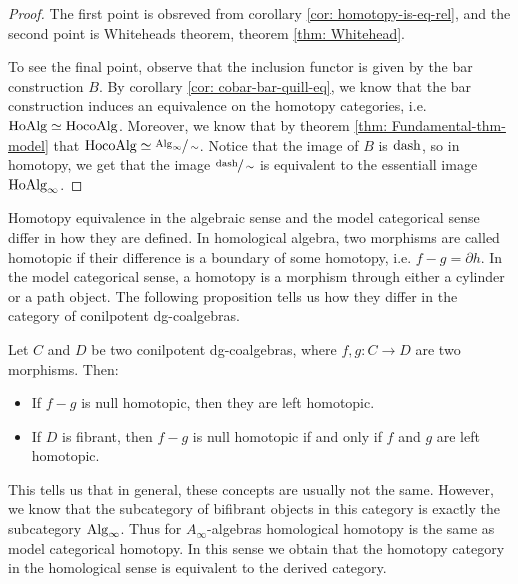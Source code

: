 \documentclass[../thesis.tex]{subfiles}
\begin{document}
    \begin{proof}
        The first point is obsreved from corollary \ref{cor: homotopy-is-eq-rel}, and the second point is Whiteheads theorem, theorem \ref{thm: Whitehead}.

        To see the final point, observe that the inclusion functor is given by the bar construction $B$. By corollary \ref{cor: cobar-bar-quill-eq}, we know that the bar construction induces an equivalence on the homotopy categories, i.e. $\tt{Ho}\tt{Alg} \simeq \tt{Ho}\tt{coAlg}$. Moreover, we know that by theorem \ref{thm: Fundamental-thm-model} that $\tt{Ho}\tt{coAlg} \simeq \sfrac{\tt{Alg}_\infty}{\sim}$. Notice that the image of $B$ is $\tt{dash}$, so in homotopy, we get that the image $\sfrac{\tt{dash}}{\sim}$ is equivalent to the essentiall image $\tt{Ho}\tt{Alg}_\infty$.
    \end{proof}

    Homotopy equivalence in the algebraic sense and the model categorical sense differ in how they are defined. In homological algebra, two morphisms are called homotopic if their difference is a boundary of some homotopy, i.e. $f-g = \partial h$. In the model categorical sense, a homotopy is a morphism through either a cylinder or a path object. The following proposition tells us how they differ in the category of conilpotent dg-coalgebras.

    \begin{proposition}
        Let $C$ and $D$ be two conilpotent dg-coalgebras, where $f,g : C \rightarrow D$ are two morphisms. Then:
        \begin{itemize}
            \item If $f-g$ is null homotopic, then they are left homotopic.
            \item If $D$ is fibrant, then $f-g$ is null homotopic if and only if $f$ and $g$ are left homotopic.
        \end{itemize}
    \end{proposition}
    
    This tells us that in general, these concepts are usually not the same. However, we know that the subcategory of bifibrant objects in this category is exactly the subcategory $\tt{Alg}_\infty$. Thus for $A_\infty$-algebras homological homotopy is the same as model categorical homotopy. In this sense we obtain that the homotopy category in the homological sense is equivalent to the derived category.
\end{document}
